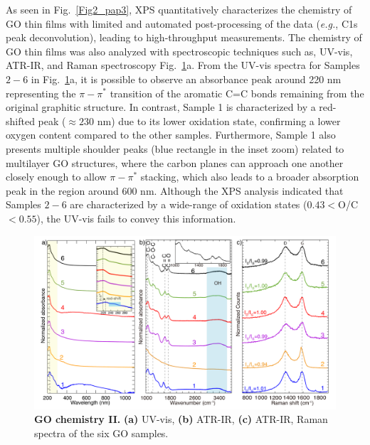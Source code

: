 As seen in Fig.~\ref{Fig2_pap3}, XPS quantitatively characterizes the chemistry of GO thin films with limited and automated post-processing of the data (\textit{e.g.}, C1s peak deconvolution), leading to high-throughput measurements. The chemistry of GO thin films was also analyzed with spectroscopic techniques such as, UV-vis, ATR-IR, and Raman spectroscopy Fig.~\ref{Fig3_pap3}a. From the UV-vis spectra for Samples $2-6$ in Fig.~\ref{Fig3_pap3}a, it is possible to observe an absorbance peak around 220 nm representing the $\pi-\pi^*$ transition of the aromatic C=C bonds remaining from the original graphitic structure.\cite{paredes2008graphene} In contrast, Sample 1 is characterized by a red-shifted peak ($\approx230$ nm) due to its lower oxidation state,\cite{li2014waveband} confirming a lower oxygen content compared to the other samples. Furthermore, Sample 1 also presents multiple shoulder peaks (blue rectangle in the inset zoom) related to multilayer GO structures,\cite{lai2012ultraviolet} where the carbon planes can approach one another closely enough to allow $\pi-\pi^*$ stacking, which also leads to a broader absorption peak in the region around 600 nm. Although the XPS analysis indicated that Samples $2-6$ are characterized by a wide-range of oxidation states ($0.43<$O/C$<0.55$), the UV-vis fails to convey this information.

\begin{figure}[t!]
  \centering
  \includegraphics[width=6in]{paper3/Fig3.pdf}
  \caption{\textbf{GO chemistry II.} \textbf{(a)}  UV-vis, \textbf{(b)} ATR-IR, \textbf{(c)} ATR-IR, Raman spectra of the six GO samples.}
  \label{Fig3_pap3}
\end{figure}

